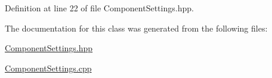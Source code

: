 Definition at line 22 of file Component\+Settings.\+hpp.



The documentation for this class was generated from the following files\+:\begin{DoxyCompactItemize}
\item 
\hyperlink{_component_settings_8hpp}{Component\+Settings.\+hpp}\item 
\hyperlink{_component_settings_8cpp}{Component\+Settings.\+cpp}\end{DoxyCompactItemize}
